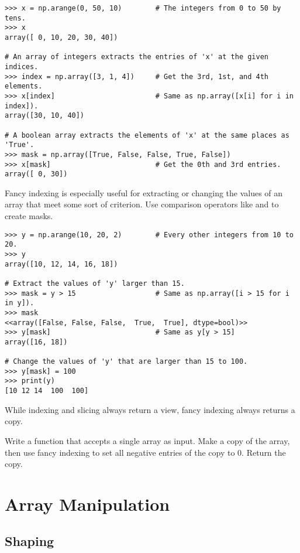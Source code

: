\begin{lstlisting}
>>> x = np.arange(0, 50, 10)        # The integers from 0 to 50 by tens.
>>> x
array([ 0, 10, 20, 30, 40])

# An array of integers extracts the entries of 'x' at the given indices.
>>> index = np.array([3, 1, 4])     # Get the 3rd, 1st, and 4th elements.
>>> x[index]                        # Same as np.array([x[i] for i in index]).
array([30, 10, 40])

# A boolean array extracts the elements of 'x' at the same places as 'True'.
>>> mask = np.array([True, False, False, True, False])
>>> x[mask]                         # Get the 0th and 3rd entries.
array([ 0, 30])
\end{lstlisting}

Fancy indexing is especially useful for extracting or changing the values of an array that meet some sort of criterion.
Use comparison operators like \li{<} and \li{==} to create masks.

\begin{lstlisting}
>>> y = np.arange(10, 20, 2)        # Every other integers from 10 to 20.
>>> y
array([10, 12, 14, 16, 18])

# Extract the values of 'y' larger than 15.
>>> mask = y > 15                   # Same as np.array([i > 15 for i in y]).
>>> mask
<<array([False, False, False,  True,  True], dtype=bool)>>
>>> y[mask]                         # Same as y[y > 15]
array([16, 18])

# Change the values of 'y' that are larger than 15 to 100.
>>> y[mask] = 100
>>> print(y)
[10 12 14  100  100]
\end{lstlisting}

While indexing and slicing always return a view, fancy indexing always returns a copy.

\begin{problem} %
Write a function that accepts a single array as input.
Make a copy of the array, then use fancy indexing to set all negative entries of the copy to $0$.
Return the copy.
\end{problem}

\section*{Array Manipulation} %

\subsection*{Shaping} %

